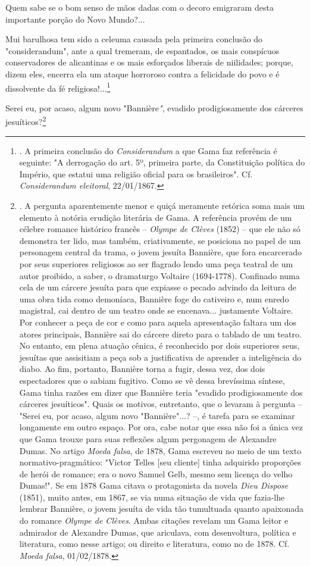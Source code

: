 Quem sabe se o bom senso de mãos dadas com o decoro emigraram desta
importante porção do Novo Mundo?...

Mui barulhosa tem sido a celeuma causada pela primeira conclusão do
"considerandum", ante a qual tremeram, de espantados, os mais conspícuos
conservadores de alicantinas e os mais esforçados liberais de
niilidades; porque, dizem eles, encerra ela um ataque horroroso contra a
felicidade do povo e é dissolvente da fé religiosa!...\footnote{. A
  primeira conclusão do \emph{Considerandum} a que Gama faz referência é
  seguinte: "A derrogação do art. 5º, primeira parte, da Constituição
  política do Império, que estatui uma religião oficial para os
  brasileiros". Cf. \emph{Considerandum eleitoral}, 22/01/1867.}

Serei eu, por acaso, algum novo "Bannière\emph{"}, evadido
prodigiosamente dos cárceres jesuíticos?\footnote{. A pergunta
  aparentemente menor e quiçá meramente retórica soma mais um elemento à
  notória erudição literária de Gama. A referência provém de um célebre
  romance histórico francês -- \emph{Olympe de Clèves} (1852) -- que ele
  não só demonstra ter lido, mas também, criativamente, se posiciona no
  papel de um personagem central da trama, o jovem jesuíta Bannière, que
  fora encarcerado por seus superiores religiosos ao ser flagrado lendo
  uma peça teatral de um autor proibido, a saber, o dramaturgo Voltaire
  (1694-1778). Confinado numa cela de um cárcere jesuíta para que
  expiasse o pecado advindo da leitura de uma obra tida como demoníaca,
  Bannière foge do cativeiro e, num enredo magistral, cai dentro de um
  teatro onde se encenava... justamente Voltaire. Por conhecer a peça de
  cor e como para aquela apresentação faltara um dos atores principais,
  Bannière sai do cárcere direto para o tablado de um teatro. No
  entanto, em plena atuação cênica, é reconhecido por dois superiores
  seus, jesuítas que assisitiam a peça sob a justificativa de aprender a
  inteligência do diabo. Ao fim, portanto, Bannière torna a fugir, dessa
  vez, dos dois espectadores que o sabiam fugitivo. Como se vê dessa
  brevíssima síntese, Gama tinha razões em dizer que Bannière teria
  "evadido prodigiosamente dos cárceres jesuíticos". Quais os motivos,
  entretanto, que o levaram à pergunta -- "Serei eu, por acaso, algum
  novo "Bannière"...? --, é tarefa para se examinar longamente em outro
  espaço. Por ora, cabe notar que essa não foi a única vez que Gama
  trouxe para suas reflexões algum pergonagem de Alexandre Dumas. No
  artigo \emph{Moeda falsa}, de 1878, Gama escreveu no meio de um texto
  normativo-pragmático: "Victor Telles {[}seu cliente{]} tinha adquirido
  proporções de herói de romance; era o novo Samuel Gelb, mesmo sem
  licença do velho Dumas!". Se em 1878 Gama citava o protagonista da
  novela \emph{Dieu Dispose} (1851), muito antes, em 1867, se via numa
  situação de vida que fazia-lhe lembrar Bannière, o jovem jesuíta de
  vida tão tumultuada quanto apaixonada do romance \emph{Olympe de
  Clèves}. Ambas citações revelam um Gama leitor e admirador de
  Alexandre Dumas, que ariculava, com desenvoltura, política e
  literatura, como nesse artigo; ou direito e literatura, como no de
  1878. Cf. \emph{Moeda falsa}, 01/02/1878.}

